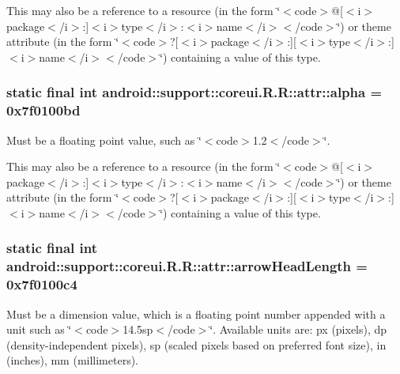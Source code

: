 This may also be a reference to a resource (in the form \char`\"{}$<$code$>$@\mbox{[}$<$i$>$package$<$/i$>$:\mbox{]}$<$i$>$type$<$/i$>$:$<$i$>$name$<$/i$>$$<$/code$>$\char`\"{}) or theme attribute (in the form \char`\"{}$<$code$>$?\mbox{[}$<$i$>$package$<$/i$>$:\mbox{]}\mbox{[}$<$i$>$type$<$/i$>$:\mbox{]}$<$i$>$name$<$/i$>$$<$/code$>$\char`\"{}) containing a value of this type. \hypertarget{classandroid_1_1support_1_1coreui_1_1_r_1_1attr_388a56e13045b16556f4fe32b55d5f6e}{
\subsubsection[{alpha}]{\setlength{\rightskip}{0pt plus 5cm}static final int android::support::coreui.R.R::attr::alpha = 0x7f0100bd}}
\label{classandroid_1_1support_1_1coreui_1_1_r_1_1attr_388a56e13045b16556f4fe32b55d5f6e}


Must be a floating point value, such as \char`\"{}$<$code$>$1.2$<$/code$>$\char`\"{}. 

This may also be a reference to a resource (in the form \char`\"{}$<$code$>$@\mbox{[}$<$i$>$package$<$/i$>$:\mbox{]}$<$i$>$type$<$/i$>$:$<$i$>$name$<$/i$>$$<$/code$>$\char`\"{}) or theme attribute (in the form \char`\"{}$<$code$>$?\mbox{[}$<$i$>$package$<$/i$>$:\mbox{]}\mbox{[}$<$i$>$type$<$/i$>$:\mbox{]}$<$i$>$name$<$/i$>$$<$/code$>$\char`\"{}) containing a value of this type. \hypertarget{classandroid_1_1support_1_1coreui_1_1_r_1_1attr_a6017b73174fe9bdd910dc8de48510d9}{
\subsubsection[{arrowHeadLength}]{\setlength{\rightskip}{0pt plus 5cm}static final int android::support::coreui.R.R::attr::arrowHeadLength = 0x7f0100c4}}
\label{classandroid_1_1support_1_1coreui_1_1_r_1_1attr_a6017b73174fe9bdd910dc8de48510d9}


Must be a dimension value, which is a floating point number appended with a unit such as \char`\"{}$<$code$>$14.5sp$<$/code$>$\char`\"{}. Available units are: px (pixels), dp (density-independent pixels), sp (scaled pixels based on preferred font size), in (inches), mm (millimeters). 

